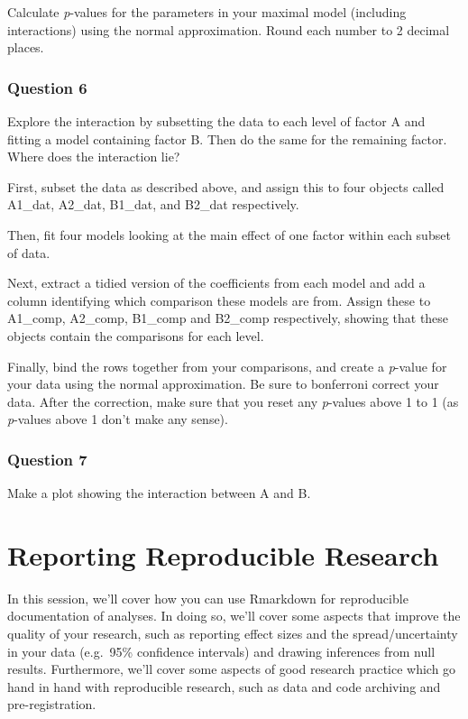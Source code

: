 \documentclass[
]{book}
\begin{document}
Calculate \emph{p}-values for the parameters in your maximal model (including interactions) using the normal approximation. Round each number to 2 decimal places.

\hypertarget{question-6-8}{%
\subsection{Question 6}\label{question-6-8}}

Explore the interaction by subsetting the data to each level of factor A and fitting a model containing factor B. Then do the same for the remaining factor. Where does the interaction lie?

First, subset the data as described above, and assign this to four objects called A1\_dat, A2\_dat, B1\_dat, and B2\_dat respectively.

Then, fit four models looking at the main effect of one factor within each subset of data.

Next, extract a tidied version of the coefficients from each model and add a column identifying which comparison these models are from. Assign these to A1\_comp, A2\_comp, B1\_comp and B2\_comp respectively, showing that these objects contain the comparisons for each level.

Finally, bind the rows together from your comparisons, and create a \emph{p}-value for your data using the normal approximation. Be sure to bonferroni correct your data. After the correction, make sure that you reset any \emph{p}-values above 1 to 1 (as \emph{p}-values above 1 don't make any sense).

\hypertarget{question-7-7}{%
\subsection{Question 7}\label{question-7-7}}

Make a plot showing the interaction between A and B.

\hypertarget{reporting-reproducible-research}{%
\chapter{Reporting Reproducible Research}\label{reporting-reproducible-research}}

In this session, we'll cover how you can use Rmarkdown for reproducible documentation of analyses. In doing so, we'll cover some aspects that improve the quality of your research, such as reporting effect sizes and the spread/uncertainty in your data (e.g.~95\% confidence intervals) and drawing inferences from null results. Furthermore, we'll cover some aspects of good research practice which go hand in hand with reproducible research, such as data and code archiving and pre-registration.
\end{document}
